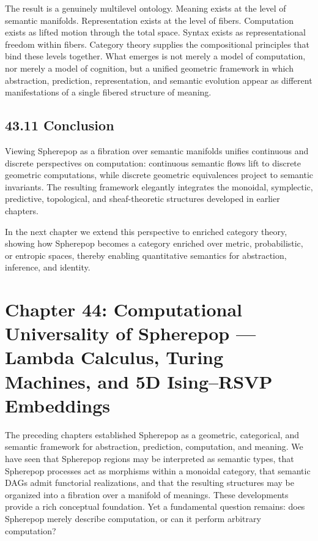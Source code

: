 \documentclass[12pt,letterpaper]{article}
\theoremstyle{remark}
\begin{document}
The result is a genuinely multilevel ontology. Meaning exists at the level of semantic manifolds. Representation exists at the level of fibers. Computation exists as lifted motion through the total space. Syntax exists as representational freedom within fibers. Category theory supplies the compositional principles that bind these levels together. What emerges is not merely a model of computation, nor merely a model of cognition, but a unified geometric framework in which abstraction, prediction, representation, and semantic evolution appear as different manifestations of a single fibered structure of meaning.

\subsection{43.11 Conclusion}

Viewing Spherepop as a fibration over semantic manifolds unifies continuous and discrete perspectives on computation: continuous semantic flows lift to discrete geometric computations, while discrete geometric equivalences project to semantic invariants. The resulting framework elegantly integrates the monoidal, symplectic, predictive, topological, and sheaf-theoretic structures developed in earlier chapters.

In the next chapter we extend this perspective to enriched category theory, showing how Spherepop becomes a category enriched over metric, probabilistic, or entropic spaces, thereby enabling quantitative semantics for abstraction, inference, and identity.
\newpage

\section{Chapter 44: Computational Universality of Spherepop —
Lambda Calculus, Turing Machines, and 5D Ising--RSVP Embeddings}

The preceding chapters established Spherepop as a geometric, categorical, and semantic framework for abstraction, prediction, computation, and meaning. We have seen that Spherepop regions may be interpreted as semantic types, that Spherepop processes act as morphisms within a monoidal category, that semantic DAGs admit functorial realizations, and that the resulting structures may be organized into a fibration over a manifold of meanings. These developments provide a rich conceptual foundation. Yet a fundamental question remains: does Spherepop merely describe computation, or can it perform arbitrary computation?
\end{document}
